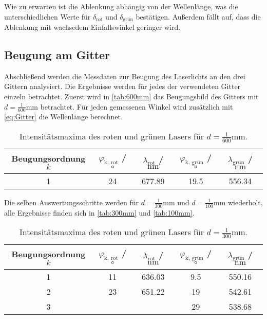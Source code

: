 Wie zu erwarten ist die Ablenkung abhängig von der Wellenlänge, was die unterschiedlichen Werte für 
$\delta_{\text{rot}}$ und $\delta_{\text{grün}}$ bestätigen.
Außerdem fällt auf, dass die Ablenkung mit wachsedem Einfallswinkel geringer wird.

\subsection{Beugung am Gitter}

Abschließend werden die Messdaten zur Beugung des Laserlichts an den drei Gittern analysiert.
Die Ergebnisse werden für jedes der verwendeten Gitter einzeln betrachtet.
Zuerst wird in \autoref{tab:600mm} das Beugungsbild des Gitters mit $d=\frac{1}{600}\unit{\milli\meter}$ betrachtet.
Für jeden gemessenen Winkel wird zusätzlich mit \eqref{eq:Gitter} die Wellenlänge berechnet.

\begin{table} [H]
  \centering
  \caption{Intensitätsmaxima des roten und grünen Lasers für $d=\frac{1}{600}\unit{\milli\meter}$.}
  \label{tab:600mm}
  \begin{tabular}{S S S S S}
    \toprule
  {Beugungsordnung $k$} & {$\varphi_{\text{k, rot}}$ / $\unit{\degree}$} & {$\lambda_{\text{rot}}$ / $\unit{\nano\meter}$}  & {$\varphi_{\text{k, grün}}$ / $\unit{\degree}$} & {$\lambda_{\text{grün}}$ / $\unit{\nano\meter}$} \\
     & 24 & 677.89 & 19.5 & 556.34 \\
    \bottomrule
  \end{tabular}
\end{table}

Die selben Auswertungsschritte werden für $d=\frac{1}{300}\unit{\milli\meter}$ und $d=\frac{1}{100}\unit{\milli\meter}$
wiederholt, alle Ergebnisse finden sich in \autoref{tab:300mm} und \autoref{tab:100mm}.

\begin{table} [H]
  \centering
  \caption{Intensitätsmaxima des roten und grünen Lasers für $d=\frac{1}{300}\unit{\milli\meter}$.}
  \label{tab:300mm}
  \begin{tabular}{S S S S S}
    \toprule
  {Beugungsordnung $k$} & {$\varphi_{\text{k, rot}}$ / $\unit{\degree}$} & {$\lambda_{\text{rot}}$ / $\unit{\nano\meter}$}  & {$\varphi_{\text{k, grün}}$ / $\unit{\degree}$} & {$\lambda_{\text{grün}}$ / $\unit{\nano\meter}$} \\
     & 11 & 636.03 & 9.5 & 550.16 \\
    2 & 23 & 651.22 & 19 & 542.61 \\
    3 &  & & 29 & 538.68 \\
    \bottomrule
  \end{tabular}
\end{table}

